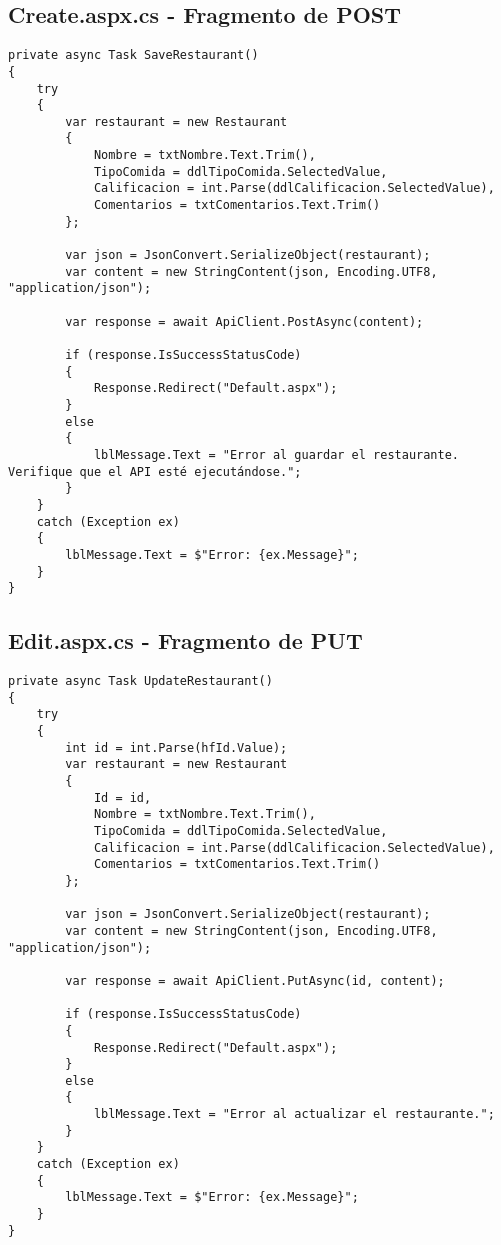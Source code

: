 \documentclass[12pt,a4paper]{report}
\begin{document}
\subsection{Create.aspx.cs - Fragmento de POST}

\begin{lstlisting}[language={[Sharp]C}]
private async Task SaveRestaurant()
{
    try
    {
        var restaurant = new Restaurant
        {
            Nombre = txtNombre.Text.Trim(),
            TipoComida = ddlTipoComida.SelectedValue,
            Calificacion = int.Parse(ddlCalificacion.SelectedValue),
            Comentarios = txtComentarios.Text.Trim()
        };

        var json = JsonConvert.SerializeObject(restaurant);
        var content = new StringContent(json, Encoding.UTF8, "application/json");
        
        var response = await ApiClient.PostAsync(content);
        
        if (response.IsSuccessStatusCode)
        {
            Response.Redirect("Default.aspx");
        }
        else
        {
            lblMessage.Text = "Error al guardar el restaurante. Verifique que el API esté ejecutándose.";
        }
    }
    catch (Exception ex)
    {
        lblMessage.Text = $"Error: {ex.Message}";
    }
}
\end{lstlisting}

\subsection{Edit.aspx.cs - Fragmento de PUT}

\begin{lstlisting}[language={[Sharp]C}]
private async Task UpdateRestaurant()
{
    try
    {
        int id = int.Parse(hfId.Value);
        var restaurant = new Restaurant
        {
            Id = id,
            Nombre = txtNombre.Text.Trim(),
            TipoComida = ddlTipoComida.SelectedValue,
            Calificacion = int.Parse(ddlCalificacion.SelectedValue),
            Comentarios = txtComentarios.Text.Trim()
        };

        var json = JsonConvert.SerializeObject(restaurant);
        var content = new StringContent(json, Encoding.UTF8, "application/json");
        
        var response = await ApiClient.PutAsync(id, content);
        
        if (response.IsSuccessStatusCode)
        {
            Response.Redirect("Default.aspx");
        }
        else
        {
            lblMessage.Text = "Error al actualizar el restaurante.";
        }
    }
    catch (Exception ex)
    {
        lblMessage.Text = $"Error: {ex.Message}";
    }
}
\end{lstlisting}
\end{document}
